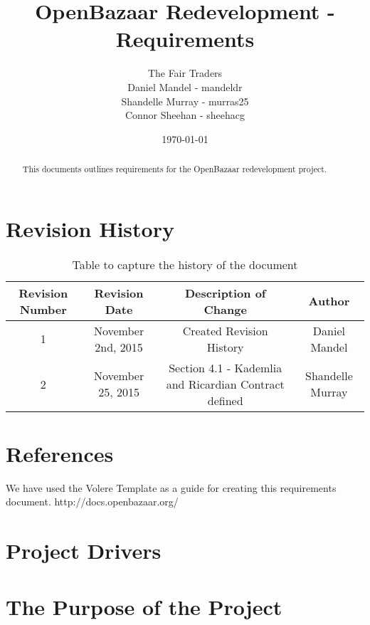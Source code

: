 \documentclass{article}
\begin{document}
\title{OpenBazaar Redevelopment - Requirements}
\author{The Fair Traders \\ Daniel Mandel - mandeldr \\ Shandelle Murray - murras25 \\ Connor Sheehan - sheehacg}
\date{\today}
\maketitle

\begin{abstract}
This documents outlines requirements for the OpenBazaar redevelopment project.
\end{abstract}

\newpage

\tableofcontents

\section*{Revision History}

\begin{table}[h!]
\centering
\begin{tabular}{||c c c c||} 
 \hline
 Revision Number & Revision Date & Description of Change & Author \\ [0.5ex] 
 \hline\hline
 1 & November 2nd, 2015 & Created Revision History & Daniel Mandel \\ [1ex] 
 \hline
 2 & November 25, 2015 & Section 4.1 - Kademlia and Ricardian Contract defined  & Shandelle Murray \\ [1ex]
 \hline
\end{tabular}
\caption{Table to capture the history of the document}
\label{table:1}
\end{table}

\section*{References}
We have used the Volere Template as a guide for creating this requirements document.
http://docs.openbazaar.org/

\section*{Project Drivers}

\section{The Purpose of the Project}
\end{document}
